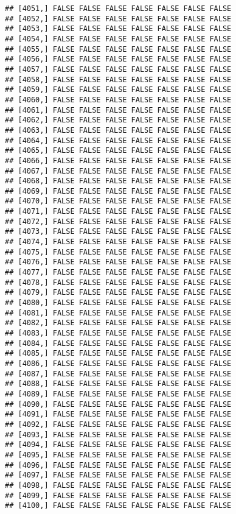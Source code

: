 \documentclass[
]{article}
\begin{document}
\begin{verbatim}
## [4051,] FALSE FALSE FALSE FALSE FALSE FALSE FALSE
## [4052,] FALSE FALSE FALSE FALSE FALSE FALSE FALSE
## [4053,] FALSE FALSE FALSE FALSE FALSE FALSE FALSE
## [4054,] FALSE FALSE FALSE FALSE FALSE FALSE FALSE
## [4055,] FALSE FALSE FALSE FALSE FALSE FALSE FALSE
## [4056,] FALSE FALSE FALSE FALSE FALSE FALSE FALSE
## [4057,] FALSE FALSE FALSE FALSE FALSE FALSE FALSE
## [4058,] FALSE FALSE FALSE FALSE FALSE FALSE FALSE
## [4059,] FALSE FALSE FALSE FALSE FALSE FALSE FALSE
## [4060,] FALSE FALSE FALSE FALSE FALSE FALSE FALSE
## [4061,] FALSE FALSE FALSE FALSE FALSE FALSE FALSE
## [4062,] FALSE FALSE FALSE FALSE FALSE FALSE FALSE
## [4063,] FALSE FALSE FALSE FALSE FALSE FALSE FALSE
## [4064,] FALSE FALSE FALSE FALSE FALSE FALSE FALSE
## [4065,] FALSE FALSE FALSE FALSE FALSE FALSE FALSE
## [4066,] FALSE FALSE FALSE FALSE FALSE FALSE FALSE
## [4067,] FALSE FALSE FALSE FALSE FALSE FALSE FALSE
## [4068,] FALSE FALSE FALSE FALSE FALSE FALSE FALSE
## [4069,] FALSE FALSE FALSE FALSE FALSE FALSE FALSE
## [4070,] FALSE FALSE FALSE FALSE FALSE FALSE FALSE
## [4071,] FALSE FALSE FALSE FALSE FALSE FALSE FALSE
## [4072,] FALSE FALSE FALSE FALSE FALSE FALSE FALSE
## [4073,] FALSE FALSE FALSE FALSE FALSE FALSE FALSE
## [4074,] FALSE FALSE FALSE FALSE FALSE FALSE FALSE
## [4075,] FALSE FALSE FALSE FALSE FALSE FALSE FALSE
## [4076,] FALSE FALSE FALSE FALSE FALSE FALSE FALSE
## [4077,] FALSE FALSE FALSE FALSE FALSE FALSE FALSE
## [4078,] FALSE FALSE FALSE FALSE FALSE FALSE FALSE
## [4079,] FALSE FALSE FALSE FALSE FALSE FALSE FALSE
## [4080,] FALSE FALSE FALSE FALSE FALSE FALSE FALSE
## [4081,] FALSE FALSE FALSE FALSE FALSE FALSE FALSE
## [4082,] FALSE FALSE FALSE FALSE FALSE FALSE FALSE
## [4083,] FALSE FALSE FALSE FALSE FALSE FALSE FALSE
## [4084,] FALSE FALSE FALSE FALSE FALSE FALSE FALSE
## [4085,] FALSE FALSE FALSE FALSE FALSE FALSE FALSE
## [4086,] FALSE FALSE FALSE FALSE FALSE FALSE FALSE
## [4087,] FALSE FALSE FALSE FALSE FALSE FALSE FALSE
## [4088,] FALSE FALSE FALSE FALSE FALSE FALSE FALSE
## [4089,] FALSE FALSE FALSE FALSE FALSE FALSE FALSE
## [4090,] FALSE FALSE FALSE FALSE FALSE FALSE FALSE
## [4091,] FALSE FALSE FALSE FALSE FALSE FALSE FALSE
## [4092,] FALSE FALSE FALSE FALSE FALSE FALSE FALSE
## [4093,] FALSE FALSE FALSE FALSE FALSE FALSE FALSE
## [4094,] FALSE FALSE FALSE FALSE FALSE FALSE FALSE
## [4095,] FALSE FALSE FALSE FALSE FALSE FALSE FALSE
## [4096,] FALSE FALSE FALSE FALSE FALSE FALSE FALSE
## [4097,] FALSE FALSE FALSE FALSE FALSE FALSE FALSE
## [4098,] FALSE FALSE FALSE FALSE FALSE FALSE FALSE
## [4099,] FALSE FALSE FALSE FALSE FALSE FALSE FALSE
## [4100,] FALSE FALSE FALSE FALSE FALSE FALSE FALSE

\end{verbatim}
\end{document}
